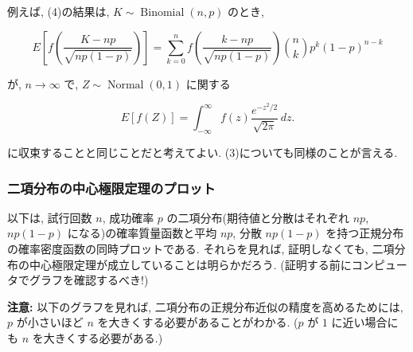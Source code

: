 \documentclass[10pt, a4paper,xelatex,ja=standard]{bxjsarticle}
\newcommand\op{\operatorname}
\begin{document}
例えば, (4)の結果は, \(K\sim\op{Binomial}(n, p)\) のとき,

\[
E\left[f\left(\dfrac{K-np}{\sqrt{np(1-p)}}\right)\right] =
\sum_{k=0}^n f\left(\dfrac{k-np}{\sqrt{np(1-p)}}\right)
\binom{n}{k}p^k(1-p)^{n-k}
\]

が, \(n\to\infty\) で, \(Z\sim\op{Normal}(0,1)\) に関する

\[
E[f(Z)] = \int_{-\infty}^\infty f(z)\frac{e^{-z^2/2}}{\sqrt{2\pi}}\,dz.
\]

に収束することと同じことだと考えてよい. (3)についても同様のことが言える.

    \hypertarget{ux4e8cux9805ux5206ux5e03ux306eux4e2dux5fc3ux6975ux9650ux5b9aux7406ux306eux30d7ux30edux30c3ux30c8}{%
\subsubsection{二項分布の中心極限定理のプロット}\label{ux4e8cux9805ux5206ux5e03ux306eux4e2dux5fc3ux6975ux9650ux5b9aux7406ux306eux30d7ux30edux30c3ux30c8}}

以下は, 試行回数 \(n\), 成功確率 \(p\) の二項分布(期待値と分散はそれぞれ
\(np\), \(np(1-p)\) になる)の確率質量函数と平均 \(np\), 分散 \(np(1-p)\)
を持つ正規分布の確率密度函数の同時プロットである. それらを見れば,
証明しなくても, 二項分布の中心極限定理が成立していることは明らかだろう.
(証明する前にコンピュータでグラフを確認するべき!)

\textbf{注意:} 以下のグラフを見れば,
二項分布の正規分布近似の精度を高めるためには, \(p\) が小さいほど \(n\)
を大きくする必要があることがわかる. (\(p\) が \(1\) に近い場合にも \(n\)
を大きくする必要がある.)
\end{document}
